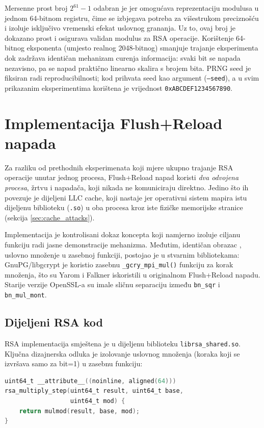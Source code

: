 Mersenne prost broj $2^{61}-1$ odabran je jer omogućava reprezentaciju modulusa u jednom 64-bitnom registru, čime se izbjegava potreba za višestrukom preciznošću i izoluje isključivo vremenski efekat uslovnog grananja. Uz to, ovaj broj je dokazano prost i osigurava validan modulus za RSA operacije. Korištenje 64-bitnog eksponenta (umjesto realnog 2048-bitnog) smanjuje trajanje eksperimenta dok zadržava identičan mehanizam curenja informacija: svaki bit se napada nezavisno, pa se napad praktično linearno skalira s brojem bita. PRNG seed je fiksiran radi reproducibilnosti; kod prihvata seed kao argument (\texttt{--seed}), a u svim prikazanim eksperimentima korištena je vrijednost \texttt{0xABCDEF1234567890}.

\section{Implementacija Flush+Reload napada}
\label{sec:fr_impl}

Za razliku od prethodnih eksperimenata koji mjere ukupno trajanje RSA operacije unutar jednog procesa, Flush+Reload napad koristi \textit{dva odvojena procesa}, žrtvu i napadača, koji nikada ne komuniciraju direktno. Jedino što ih povezuje je dijeljeni LLC cache, koji nastaje jer operativni sistem mapira istu dijeljenu biblioteku (\texttt{.so}) u oba procesa kroz iste fizičke memorijske stranice (sekcija \ref{sec:cache_attacks}).

Implementacija je kontrolisani dokaz koncepta koji namjerno izoluje ciljanu funkciju radi jasne demonstracije mehanizma. Međutim, identičan obrazac , uslovno množenje u zasebnoj funkciji, postojao je u stvarnim bibliotekama: GnuPG/libgcrypt je koristio zasebnu \texttt{\_gcry\_mpi\_mul()} funkciju za korak množenja, što su Yarom i Falkner \cite{yarom2014} iskoristili u originalnom Flush+Reload napadu. Starije verzije OpenSSL-a su imale sličnu separaciju između \texttt{bn\_sqr} i \texttt{bn\_mul\_mont}.

\subsection{Dijeljeni RSA kod}

RSA implementacija smještena je u dijeljenu biblioteku \texttt{librsa\_shared.so}. Ključna dizajnerska odluka je izolovanje uslovnog množenja (koraka koji se izvršava samo za bit=1) u zasebnu funkciju:

\begin{lstlisting}[language=C, caption={Ciljana funkcija za Flush+Reload napad}, label=lst:fr_target]
uint64_t __attribute__((noinline, aligned(64)))
rsa_multiply_step(uint64_t result, uint64_t base,
                  uint64_t mod) {
    return mulmod(result, base, mod);
}
\end{lstlisting}

